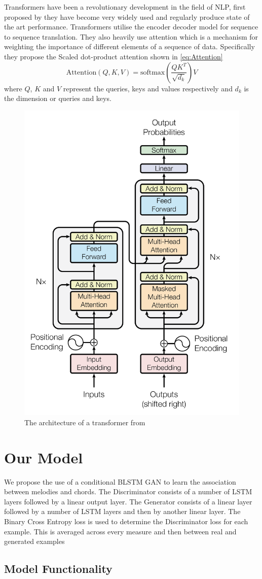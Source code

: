Transformers have been a revolutionary development in the field of NLP, first proposed by \cite{Transformers} they have become very widely used and regularly produce state of the art performance.
Transformers utilise the encoder decoder model for sequence to sequence translation.
They also heavily use attention which is a mechanism for weighting the importance of different elements of a sequence of data.
Specifically they propose the Scaled dot-product attention shown in \ref{eq:Attention}
\begin{equation}
    \text{Attention}(Q,K,V) = \text{softmax}(\frac{QK^T}{\sqrt{d_k}})V
    \label{eq:Attention}
\end{equation}
where $Q$, $K$ and $V$ represent the queries, keys and values respectively and $d_k$ is the dimension or queries and keys.
\begin{figure}
    \centering
    \includegraphics[width=0.4\columnwidth]{Figures/Transformer}
    \decoRule
    \caption{The architecture of a transformer from \cite{Transformers}}
    \label{fig:Transformer}
\end{figure}

\section{Our Model}

We propose the use of a conditional BLSTM GAN to learn the association between melodies and chords.
The Discriminator consists of a number of LSTM layers followed by a linear output layer.
The Generator consists of a linear layer followed by a number of LSTM layers and then by another linear layer.
The Binary Cross Entropy loss is used to determine the Discriminator loss for each example. This is averaged across every measure and then between real and generated examples
\subsection{Model Functionality}

